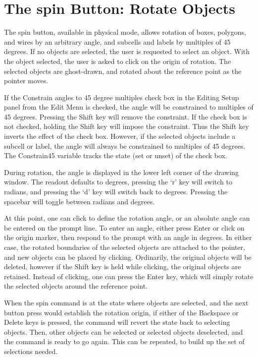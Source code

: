 \section{The {\cb spin} Button: Rotate Objects}

The {\cb spin} button, available in physical mode, allows rotation of
boxes, polygons, and wires by an arbitrary angle, and subcells and
labels by multiples of 45 degrees.  If no objects are selected, the
user is requested to select an object.  With the object selected, the
user is asked to click on the origin of rotation.  The selected
objects are ghost-drawn, and rotated about the reference point as the
pointer moves.

If the {\cb Constrain angles to 45 degree multiples} check box in the
{\cb Editing Setup} panel from the {\cb Edit Menu} is checked, the
angle will be constrained to multiples of 45 degrees.  Pressing the
{\kb Shift} key will remove the constraint.  If the check box is not
checked, holding the {\kb Shift} key will impose the constraint.  Thus
the {\kb Shift} key inverts the effect of the check box.  However, if
the selected objects include a subcell or label, the angle will always
be constrained to multiples of 45 degrees.  The {\et Constrain45}
variable tracks the state (set or unset) of the check box.

During rotation, the angle is displayed in the lower left corner of
the drawing window.  The readout defaults to degrees, pressing the
`{\vt r}' key will switch to radians, and pressing the `{\vt d}' key
will switch back to degrees.  Pressing the spacebar will toggle
between radians and degrees.

At this point, one can click to define the rotation angle, or an
absolute angle can be entered on the prompt line.  To enter an angle,
either press {\kb Enter} or click on the origin marker, then respond
to the prompt with an angle in degrees.  In either case, the rotated
boundaries of the selected objects are attached to the pointer, and
new objects can be placed by clicking.  Ordinarily, the original
objects will be deleted, however if the {\kb Shift} key is held while
clicking, the original objects are retained.  Instead of clicking, one
can press the {\kb Enter} key, which will simply rotate the selected
objects around the reference point.

When the {\cb spin} command is at the state where objects are
selected, and the next button press would establish the rotation
origin, if either of the {\kb Backspace} or {\kb Delete} keys is
pressed, the command will revert the state back to selecting objects. 
Then, other objects can be selected or selected objects deselected,
and the command is ready to go again.  This can be repeated, to build
up the set of selections needed.

